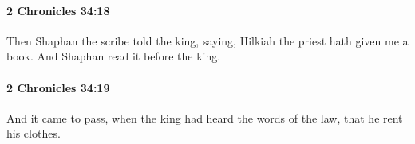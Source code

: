 		\paragraph{2 Chronicles 34:18} %
			\label{2CHRONICLES-34-18}

			Then Shaphan the scribe told the king, saying, Hilkiah the priest hath given me a book. And Shaphan read it before the king.


		\paragraph{2 Chronicles 34:19} %
			\label{2CHRONICLES-34-19}

			And it came to pass, when the king had heard the words of the law, that he rent his clothes.


